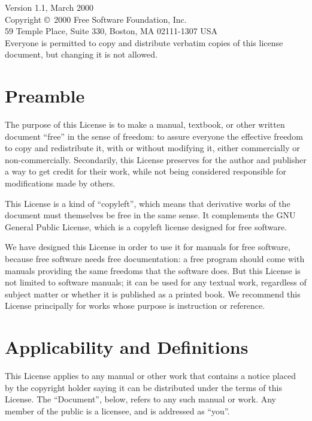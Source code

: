 \documentclass[12pt,twoside,openright,a4paper]{book}
\begin{document}
\begingroup
	\small

	Version 1.1, March 2000\\

	Copyright \copyright\ 2000  Free Software Foundation, Inc.\\
		59 Temple Place, Suite 330, Boston, MA  02111-1307  USA\\
	Everyone is permitted to copy and distribute verbatim copies
	of this license document, but changing it is not allowed.

	\section*{Preamble}

	The purpose of this License is to make a manual, textbook, or other
	written document ``free'' in the sense of freedom: to assure everyone
	the effective freedom to copy and redistribute it, with or without
	modifying it, either commercially or non-commercially.  Secondarily,
	this License preserves for the author and publisher a way to get
	credit for their work, while not being considered responsible for
	modifications made by others.

	This License is a kind of ``copyleft'', which means that derivative
	works of the document must themselves be free in the same sense.  It
	complements the GNU General Public License, which is a copyleft
	license designed for free software.

	We have designed this License in order to use it for manuals for free
	software, because free software needs free documentation: a free
	program should come with manuals providing the same freedoms that the
	software does.  But this License is not limited to software manuals;
	it can be used for any textual work, regardless of subject matter or
	whether it is published as a printed book.  We recommend this License
	principally for works whose purpose is instruction or reference.

	\section{Applicability and Definitions}

	This License applies to any manual or other work that contains a
	notice placed by the copyright holder saying it can be distributed
	under the terms of this License.  The ``Document'', below, refers to any
	such manual or work.  Any member of the public is a licensee, and is
	addressed as ``you''.
\end{document}

